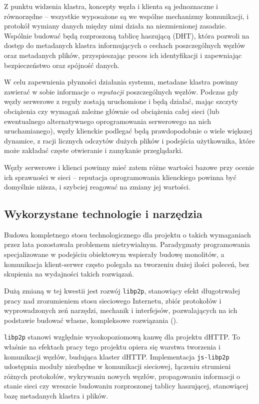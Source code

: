 Z punktu widzenia klastra, koncepty węzła i klienta są jednoznaczne i równorzędne -- wszystkie wyposażone są we wspólne mechanizmy komunikacji, i protokół wymiany danych między nimi działa na niezmienionej zasadzie. Wspólnie budować będą rozproszoną tablicę haszującą (DHT), która pozwoli na dostęp do metadanych klastra informujących o cechach poszczególnych węzłów oraz metadanych plików, przyspieszając proces ich identyfikacji i zapewniając bezpieczeństwo oraz spójność danych.

W celu zapewnienia płynności działania systemu, metadane klastra powinny zawierać w sobie informacje o {\em reputacji} poszczególnych węzłów. Podczas gdy węzły serwerowe z reguły zostają uruchomione i będą działać, mając szczyty obciążenia czy wymagań zależne głównie od obciążenia całej sieci (lub ewentualnego alternatywnego oprogramowania serwerowego na nich uruchamianego), węzły klienckie podlegać będą prawdopodobnie o wiele większej dynamice, z racji licznych odczytów dużych plików i podejścia użytkownika, które może zakładać częste otwieranie i zamykanie przeglądarki.

Węzły serwerowe i klienci powinny mieć zatem różne wartości bazowe przy ocenie ich sprawności w sieci -- reputacja oprogramowania klienckiego powinna być domyślnie niższa, i szybciej reagować na zmiany jej wartości.

\subsection{Wykorzystane technologie i narzędzia}
\label{sec:techNTools}

Budowa kompletnego stosu technologicznego dla projektu o takich wymaganiach przez lata pozostawała problemem nietrywialnym. Paradygmaty programowania specjalizowane w podejściu obiektowym wspierały budowę monolitów, a komunikacja klient-serwer często polegała na tworzeniu dużej ilości poleceń, bez skupienia na wydajności takich rozwiązań.

Dużą zmianą w tej kwestii jest rozwój \texttt{libp2p}, stanowiący efekt długotrwałej pracy nad zrozumieniem stosu sieciowego Internetu, zbiór protokołów i wyprowadzonych zeń narzędzi, mechanik i interfejsów, pozwalających na ich podstawie budować własne, kompleksowe rozwiązania (\cite{libp2p-specs}).

\texttt{libp2p} stanowi względnie wysokopoziomową kanwę dla projektu dHTTP. To właśnie na efektach pracy tego projektu opiera się warstwa tworzenia i komunikacji węzłów, budująca klaster dHTTP. Implementacja \texttt{js-libp2p} udostępnia moduły niezbędne w komunikacji sieciowej, łączeniu strumieni różnych protokołów, wykrywaniu nowych węzłów, propagowaniu informacji o stanie sieci czy wreszcie budowaniu rozproszonej tablicy haszującej, stanowiącej bazę metadanych klastra i plików.

